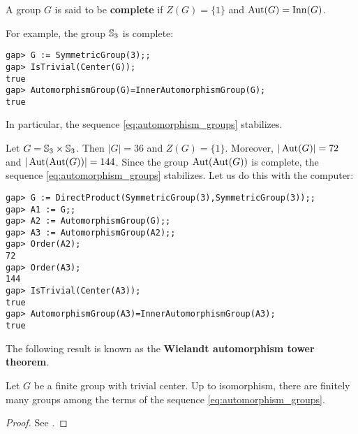 \begin{definition}
    A group $G$ is said to be \textbf{complete} if $Z(G)=\{1\}$ and
    $\operatorname{Aut}(G)=\mathrm{Inn}(G)$. 
\end{definition}

\begin{example}
For example, the group $\mathbb{S}_3$ is complete:
\begin{lstlisting}
gap> G := SymmetricGroup(3);;
gap> IsTrivial(Center(G));
true
gap> AutomorphismGroup(G)=InnerAutomorphismGroup(G);
true    
\end{lstlisting}
In particular, the sequence \eqref{eq:automorphism_groups}
stabilizes. 
\end{example}

\begin{example}
    Let $G=\mathbb{S}_3\times\mathbb{S}_3$. Then $|G|=36$ and $Z(G)=\{1\}$. Moreover, 
    $|\operatorname{Aut}(G)|=72$ and $|\operatorname{Aut}(\operatorname{Aut}(G))|=144$. Since the group
    $\operatorname{Aut}(\operatorname{Aut}(G))$ is complete, the sequence \eqref{eq:automorphism_groups} stabilizes. Let us do this 
    with the computer: 
\begin{lstlisting}
gap> G := DirectProduct(SymmetricGroup(3),SymmetricGroup(3));;
gap> A1 := G;;
gap> A2 := AutomorphismGroup(G);;
gap> A3 := AutomorphismGroup(A2);;
gap> Order(A2);
72
gap> Order(A3);
144
gap> IsTrivial(Center(A3));
true
gap> AutomorphismGroup(A3)=InnerAutomorphismGroup(A3);
true    
\end{lstlisting}
\end{example}

The following result is known as the \textbf{Wielandt automorphism tower theorem}. 

\begin{theorem}[Wielandt]
    \label{thm:Wielandt:automorphism}
    Let $G$ be a finite group with trivial center. Up to isomorphism, there
    are finitely many groups among the terms of the sequence \eqref{eq:automorphism_groups}.  
\end{theorem}

\begin{proof}
    See \cite[Theorem 9.10]{MR2426855}.
\end{proof}